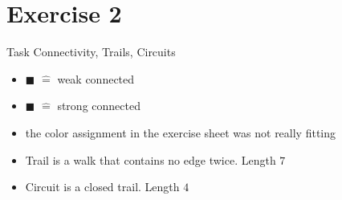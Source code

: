 
\section{Exercise 2}

\setcounter{exercise}{1}

\begin{frame}[allowframebreaks]{Task \thesection}{Connectivity, Trails, Circuits}
    \begin{exercisenoinc}
    \end{exercisenoinc}
    \begin{solution}
        \begin{itemize}
            \item \textcolor{SecondaryColor}{$\blacksquare$} $\hat=$ weak connected
            \item \textcolor{PrimaryColor}{$\blacksquare$} $\hat=$ strong connected
            \item the color assignment in the exercise sheet was not really fitting
        \end{itemize}
    \end{solution}
    \begin{solutionnoinc}
        \begin{itemize}
            \item \alert{Trail} is a walk that contains no edge twice. Length $7$
        \end{itemize}
    \end{solutionnoinc}
    \begin{solutionnoinc}
        \begin{itemize}
            \item \alert{Circuit} is a closed trail. Length $4$
        \end{itemize}
    \end{solutionnoinc}
\end{frame}
